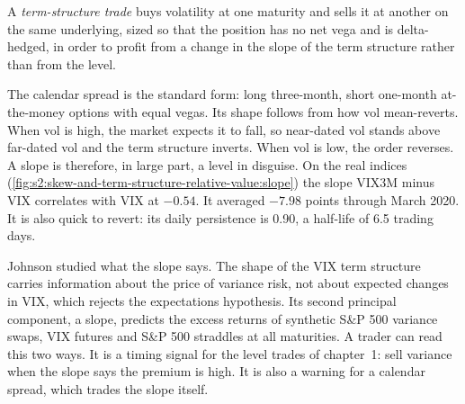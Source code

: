 \begin{definition}\label{def:s2:skew-and-term-structure-relative-value:term}
A \emph{term-structure trade} buys volatility at one maturity and sells it at another on the same underlying, sized so
that the position has no net vega and is delta-hedged, in order to profit from a change in the slope of the term structure rather than from the level.
\end{definition}

The calendar spread is the standard form: long three-month, short one-month at-the-money options with equal vegas. Its shape follows from how vol
mean-reverts. When vol is high, the market expects it to fall, so near-dated vol stands above far-dated vol and the term structure inverts. When vol is
low, the order reverses. A slope is therefore, in large part, a level in disguise. On the real indices (\cref{fig:s2:skew-and-term-structure-relative-value:slope})
the slope VIX3M minus VIX correlates with VIX at $-0.54$. It averaged $-7.98$ points through March 2020. It is also quick to revert: its daily
persistence is 0.90, a half-life of 6.5 trading days.

\begin{omfigure}

\label{fig:s2:skew-and-term-structure-relative-value:slope}
\end{omfigure}

Johnson studied what the slope says. The shape of the VIX term structure carries information about the price of variance risk, not about expected
changes in VIX, which rejects the expectations hypothesis. Its second principal component, a slope, predicts the excess returns of synthetic S\&P 500
variance swaps, VIX futures and S\&P 500 straddles at all maturities. A trader can read this two ways. It is a timing signal for the level trades of
chapter~1: sell variance when the slope says the premium is high. It is also a warning for a calendar spread, which trades the slope itself.

